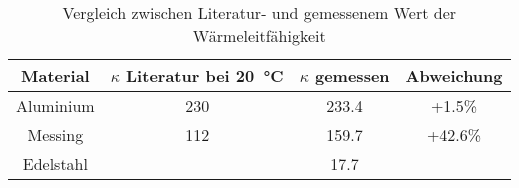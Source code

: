 \begin{table}[h!]
\begin{center}
\begin{tabular}{c|c|c|c}
	Material & $\kappa$ Literatur bei \SI{20}{\celsius} & $\kappa$ gemessen & Abweichung \\
\hline
	Aluminium & 230 & 233.4 & +1.5\% \\
	Messing & 112 & 159.7 & +42.6\% \\
	Edelstahl & & 17.7 & \\
\end{tabular}
\end{center}
\caption{Vergleich zwischen Literatur- und gemessenem Wert der Wärmeleitfähigkeit\footnotemark}
\end{table}
